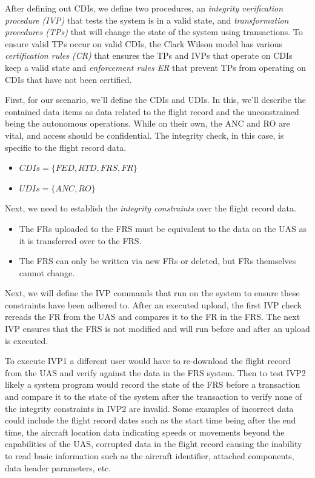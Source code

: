 \documentclass[10pt,journal,compsoc]{IEEEtran}
\begin{document}
After defining out CDIs, we define two procedures, an \textit{integrity verification procedure (IVP)} that tests the system is in a valid state, and \textit{transformation procedures (TPs)} that will change the state of the system using transactions. To ensure valid TPs occur on valid CDIs, the Clark Wilson model has various \textit{certification rules (CR)} that ensures the TPs and IVPs that operate on CDIs keep a valid state and \textit{enforcement rules {ER}} that prevent TPs from operating on CDIs that have not been certified.

First, for our scenario, we'll define the CDIs and UDIs. In this, we'll describe the contained data items as data related to the flight record and the unconstrained being the autonomous operations. While on their own, the ANC and RO are vital, and access should be confidential. The integrity check, in this case, is specific to the flight record data. 

\begin{itemize}
  \item $CDIs=\{FED, RTD, FRS, FR\}$
  \item $UDIs=\{ANC, RO\}$
\end{itemize}

Next, we need to establish the \textit{integrity constraints} over the flight record data. 

\begin{itemize}
  \item The FRs uploaded to the FRS must be equivalent to the data on the UAS as it is transferred over to the FRS.
  \item The FRS can only be written via new FRs or deleted, but FRs themselves cannot change.
\end{itemize}

Next, we will define the IVP commands that run on the system to ensure these constraints have been adhered to. 
After an executed upload, the first IVP check rereads the FR from the UAS and compares it to the FR in the FRS.
The next IVP ensures that the FRS is not modified and will run before and after an upload is executed.

To execute IVP1 a different user would have to re-download the flight record from the UAS and verify against the data in the FRS system. 
Then to test IVP2 likely a system program would record the state of the FRS before a transaction and compare it to the state of the system after the transaction to verify none of the integrity constraints in IVP2 are invalid. 
Some examples of incorrect data could include the flight record dates such as the start time being after the end time, the aircraft location data indicating speeds or movements beyond the capabilities of the UAS, corrupted data in the flight record causing the inability to read basic information such as the aircraft identifier, attached components, data header parameters, etc.
\end{document}
